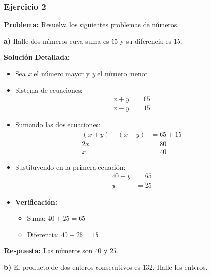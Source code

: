 
\subsubsection*{Ejercicio 2}
\textbf{Problema:} Resuelva los siguientes problemas de números.

\medskip

\textbf{a)} Halle dos números cuya suma es 65 y su diferencia es 15.

\textbf{Solución Detallada:}
\begin{itemize}
    \item Sea $x$ el número mayor y $y$ el número menor
    \item Sistema de ecuaciones:
    \begin{align*}
    x + y &= 65 \\
    x - y &= 15
    \end{align*}
    \item Sumando las dos ecuaciones:
    \begin{align*}
    (x + y) + (x - y) &= 65 + 15 \\
    2x &= 80 \\
    x &= 40
    \end{align*}
    \item Sustituyendo en la primera ecuación:
    \begin{align*}
    40 + y &= 65 \\
    y &= 25
    \end{align*}
    \item \textbf{Verificación:}
    \begin{itemize}
        \item Suma: $40 + 25 = 65$ \checkmark
        \item Diferencia: $40 - 25 = 15$ \checkmark
    \end{itemize}
\end{itemize}

\textbf{Respuesta:} Los números son 40 y 25.

\medskip

\textbf{b)} El producto de dos enteros consecutivos es 132. Halle los enteros.

